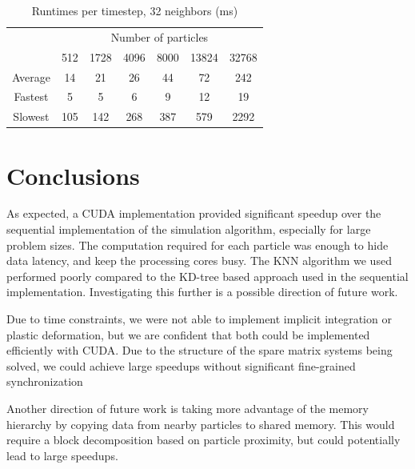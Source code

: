 \documentclass[cameraready]{acmsiggraph-awb}
\begin{document}
\begin{table}[htdp]
\caption{Runtimes per timestep, 32 neighbors (ms)}
\begin{center}
\begin{tabular}{ccccccc}
& \multicolumn{6}{c}{Number of particles} \\
& 512 & 1728 & 4096 & 8000 & 13824 & 32768 \\ \hline
Average &14	&21	&26	&44	&72	&242 \\
Fastest & 5&	5&	6	&9	&12	&19 \\
Slowest & 105&	142	&268	&387	&579&	2292\\
\end{tabular}
\end{center}
\label{tab:scaling2}
\end{table}%

\section{Conclusions}

As expected, a CUDA implementation provided significant speedup over the sequential implementation of the simulation algorithm, especially for large problem sizes.  The computation required for each particle was enough to hide data latency, and keep the processing cores busy.  The KNN algorithm we used performed poorly compared to the KD-tree based approach used in the sequential implementation.  Investigating this further is a possible direction of future work.

Due to time constraints, we were not able to implement implicit integration or plastic deformation, but we are confident that both could be implemented efficiently with CUDA.  Due to the structure of the spare matrix systems being solved, we could achieve large speedups without significant fine-grained synchronization

Another direction of future work is taking more advantage of the memory hierarchy by copying data from nearby particles to shared memory.  This would require a block decomposition based on particle proximity, but could potentially lead to large speedups.  
\end{document}
